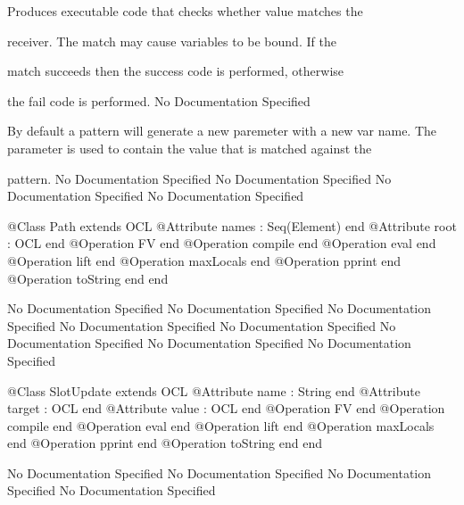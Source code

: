          Produces executable code that checks whether value matches the

         receiver. The match may cause variables to be bound. If the

         match succeeds then the success code is performed, otherwise

         the fail code is performed.
No Documentation Specified

         By default a pattern will generate a new paremeter with a new var name.
         The parameter is used to contain the value that is matched against the

         pattern.
No Documentation Specified
No Documentation Specified
No Documentation Specified
No Documentation Specified
\begin{Interface}
@Class Path extends OCL
  @Attribute names : Seq(Element) end
  @Attribute root : OCL end
  @Operation FV end
  @Operation compile end
  @Operation eval end
  @Operation lift end
  @Operation maxLocals end
  @Operation pprint end
  @Operation toString end
end
\end{Interface}
No Documentation Specified
No Documentation Specified
No Documentation Specified
No Documentation Specified
No Documentation Specified
No Documentation Specified
No Documentation Specified
No Documentation Specified
\begin{Interface}
@Class SlotUpdate extends OCL
  @Attribute name : String end
  @Attribute target : OCL end
  @Attribute value : OCL end
  @Operation FV end
  @Operation compile end
  @Operation eval end
  @Operation lift end
  @Operation maxLocals end
  @Operation pprint end
  @Operation toString end
end
\end{Interface}
No Documentation Specified
No Documentation Specified
No Documentation Specified
No Documentation Specified
